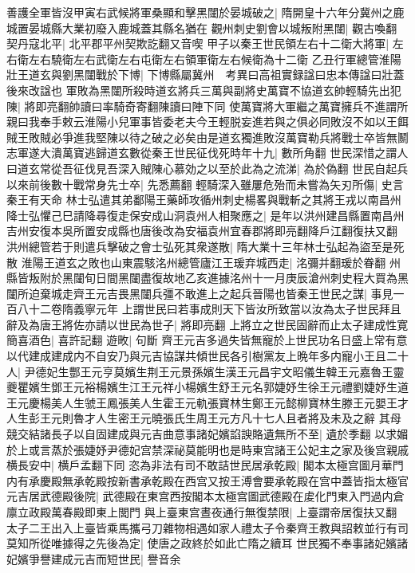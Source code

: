 善護全軍皆沒甲寅右武候將軍桑顯和擊黑闥於晏城破之|{
	隋開皇十六年分冀州之鹿城置晏城縣大業初廢入鹿城蓋其縣名猶在}
觀州刺史劉會以城叛附黑闥|{
	觀古喚翻}
契丹寇北平|{
	北平郡平州契欺訖翻又音喫}
甲子以秦王世民領左右十二衛大將軍|{
	左右衛左右驍衛左右武衛左右屯衛左右領軍衛左右候衛為十二衛}
乙丑行軍總管淮陽壯王道玄與劉黑闥戰於下博|{
	下博縣屬冀州　考異曰高祖實録諡曰忠本傳諡曰壯蓋後來改諡也}
軍敗為黑闥所殺時道玄將兵三萬與副將史萬寶不協道玄帥輕騎先出犯陳|{
	將即亮翻帥讀曰率騎奇寄翻陳讀曰陣下同}
使萬寶將大軍繼之萬寶擁兵不進謂所親曰我奉手敕云淮陽小兒軍事皆委老夫今王輕脱妄進若與之俱必同敗沒不如以王餌賊王敗賊必爭進我堅陳以待之破之必矣由是道玄獨進敗沒萬寶勒兵將戰士卒皆無鬭志軍遂大潰萬寶逃歸道玄數從秦王世民征伐死時年十九|{
	數所角翻}
世民深惜之謂人曰道玄常從吾征伐見吾深入賊陳心慕効之以至於此為之流涕|{
	為於偽翻}
世民自起兵以來前後數十戰常身先士卒|{
	先悉薦翻}
輕騎深入雖屢危殆而未嘗為矢刃所傷|{
	史言秦王有天命}
林士弘遣其弟鄱陽王藥師攻循州刺史楊畧與戰斬之其將王戎以南昌州降士弘懼己巳請降尋復走保安成山洞袁州人相聚應之|{
	是年以洪州建昌縣置南昌州吉州安復本吳所置安成縣也唐後改為安福袁州宜春郡將即亮翻降戶江翻復扶又翻}
洪州總管若于則遣兵擊破之會士弘死其衆遂散|{
	隋大業十三年林士弘起為盜至是死散}
淮陽王道玄之敗也山東震駭洺州總管廬江王瑗弃城西走|{
	洺彌并翻瑗於眷翻}
州縣皆叛附於黑闥旬日間黑闥盡復故地乙亥進據洺州十一月庚辰滄州刺史程大買為黑闥所迫棄城走齊王元吉畏黑闥兵彊不敢進上之起兵晉陽也皆秦王世民之謀|{
	事見一百八十二卷隋義寧元年}
上謂世民曰若事成則天下皆汝所致當以汝為太子世民拜且辭及為唐王將佐亦請以世民為世子|{
	將即亮翻}
上將立之世民固辭而止太子建成性寛簡喜酒色|{
	喜許記翻}
遊畋|{
	句斷}
齊王元吉多過失皆無寵於上世民功名日盛上常有意以代建成建成内不自安乃與元吉協謀共傾世民各引樹黨友上晩年多内寵小王且二十人|{
	尹德妃生酆王元亨莫嬪生荆王元景孫嬪生漢王元昌宇文昭儀生韓王元嘉魯王靈夔瞿嬪生鄧王元裕楊嬪生江王元祥小楊嬪生舒王元名郭婕妤生徐王元禮劉婕妤生道王元慶楊美人生虢王鳳張美人生霍王元軌張寶林生鄭王元懿柳寶林生滕王元嬰王才人生彭王元則魯才人生密王元曉張氏生周王元方凡十七人且者將及未及之辭}
其母競交結諸長子以自固建成與元吉曲意事諸妃嬪諂諛賂遺無所不至|{
	遺於季翻}
以求媚於上或言蒸於張婕妤尹德妃宫禁深祕莫能明也是時東宫諸王公妃主之家及後宫親戚横長安中|{
	横戶孟翻下同}
恣為非法有司不敢詰世民居承乾殿|{
	閣本太極宫圖月華門内有承慶殿無承乾殿按新書承乾殿在西宫又按王溥會要承乾殿在宫中蓋皆指太極官}
元吉居武德殿後院|{
	武德殿在東宫西按閣本太極宫圖武德殿在䖍化門東入門過内倉廪立政殿萬春殿即東上閭門}
與上臺東宫晝夜通行無復禁限|{
	上臺謂帝居復扶又翻}
太子二王出入上臺皆乘馬攜弓刀雜物相遇如家人禮太子令秦齊王教與詔敕並行有司莫知所從唯據得之先後為定|{
	使唐之政終於如此亡隋之續耳}
世民獨不奉事諸妃嬪諸妃嬪爭譽建成元吉而短世民|{
	譽音余}
